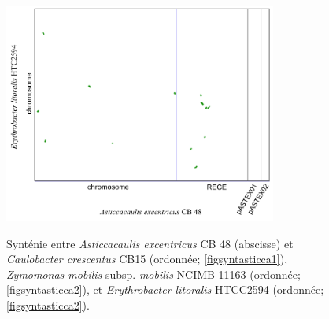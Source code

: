 \begin{figure}[H]
	\begin{center}
	\begin{minipage}{0.5\textwidth}
	\centering
	\includegraphics[width=0.8\textwidth]{./img/synteny/new/fig8_5c.png}
	\label{figsyntasticca3}
	\end{minipage}
	\end{center} 
\caption[Synténie d'\textit{Asticcacaulis} \textit{vs.} autre Caulobacteraceae et Sphingomonaceae]{Synténie entre \textit{Asticcacaulis excentricus} CB 48 (abscisse) et \textit{Caulobacter crescentus} CB15 (ordonnée; \ref{figsyntasticca1}), \textit{Zymomonas mobilis} subsp. \textit{mobilis} NCIMB 11163 (ordonnée; \ref{figsyntasticca2}), et \textit{Erythrobacter litoralis }HTCC2594 (ordonnée; \ref{figsyntasticca2}).} \label{figsyntasticca}
\end{figure}

